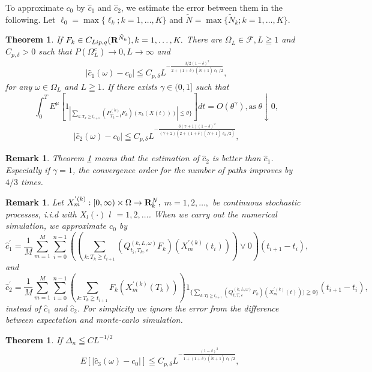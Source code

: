 \documentclass[12pt]{article}
\newtheorem{theorem}[thm]{Theorem}
\newtheorem{remark}[thm]{Remark}
\begin{document}
To approximate $c_0$ by $\hat{c}_1$ and $\hat{c}_2$, we estimate the error between them in the following.
Let $\ell_0 = \max\{\ell_k; k=1,\ldots, K\}$ and $\tilde{N} = \max\{\tilde{N}_k; k=1,\ldots, K\}$.
\begin{theorem}\label{main1}
If $F_k \in C_{Lip,q}({\bf R}^{\tilde{N}_k}), k=1,\ldots,K.$ 
 There are $\Omega_{L} \in \mathcal{F}, L\geqq 1$ and $C_{p,\delta}>0$ such that $P(\Omega_{L}^c) \to 0, L\to \infty$
 and
\begin{align}
|\hat{c}_1(\omega)-c_0| \leqq C_{p,\delta}L^{-\frac{3/2(1-\delta)^2}{2+(1+\delta)(\tilde{N}+1)\ell_0/2}},
\end{align}
for any $\omega \in \Omega_{L}$ and $L \geqq 1$.
If there exists $\gamma \in (0,1]$ such that
$$\int_0^T E^{\mu}
[ 1_{| \sum_{k:T_k\geqq t_{i+1}} (P_{T_k-t}^{(k)}F_k)(\pi_k (X(t)))| \leqq \theta\} } ]dt =O(\theta^{\gamma})
 , \text{as} \ \theta \downarrow 0,$$
\begin{align}
|\hat{c}_2(\omega)-c_0| \leqq C_{p,\delta}L^{-\frac{3(\gamma+1)(1-\delta)^2}{(\gamma+2)(2+(1+\delta)(\tilde{N}+1)\ell_0/2)}},\end{align}
\end{theorem}

\begin{remark}
Theorem \ref{main1} means that the estimation of $\hat{c}_2$ is better than $\hat{c}_1$. 
Especially if $\gamma = 1$, the convergence order for the number of paths  improves by $4/3$ times.
\end{remark}

\begin{remark}
Let $X_{m}^{'(k)}:[0,\infty ) \times \Omega \to {\bf R}^N_k,$ 
$m =1,2,\ldots ,$ be continuous stochastic processes, i.i.d with
$X_{l}(\cdot )$ $l$ $=1,2,\ldots$.
When we carry out the numerical simulation, we approximate $c_0$ by 
$$\hat{c}_1^{'}= \frac{1}{M} \sum_{m=1}^M \sum_{i=0}^{n-1} (( \sum_{k:T_k\geqq t_{i+1}} (Q_{t_i,T_k,\varepsilon}^{(k,L,\omega)}F_k)(X_m^{'(k)}(t_i)))\vee0)(t_{i+1}-t_i) ,$$ 
and
$$\hat{c}_2^{'}= \frac{1}{M} \sum_{m=1}^M \sum_{i=0}^{n-1} ( \sum_{k:T_k\geqq t_{i+1}}F_k(X_m^{'(k)}(T_k)))
 1_{\{\sum_{k:T_k\geqq t_{i+1}} (Q_{t,T,\varepsilon}^{(k,L,\omega)}F_k)(X_m^{'(k)}(t))) \geqq 0\}}(t_{i+1}-t_i),$$ 
 instead of $\hat{c}_1$ and $\hat{c}_2$.
 For simplicity we ignore the error from the difference between 
 expectation and monte-carlo simulation. 
\end{remark}

\begin{theorem} \label{main2}
If $\Delta_n\leqq C L^{-1/2}$
\begin{align*}
&E[|\hat{c}_3(\omega)-c_0|]
\leqq   C_{p,\delta}L^{-\frac{(1-\delta)^2}{1+(1+\delta)(\tilde{N}+1)\ell_0/2}},
\end{align*}
\end{theorem}
\end{document}
